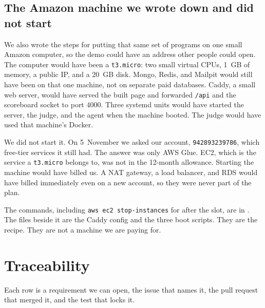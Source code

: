 \documentclass[11pt,a4paper]{article}
\begin{document}
\subsection{The Amazon machine we wrote down and did not start}

We also wrote the steps for putting that same set of programs on one small Amazon computer, so the demo could have an address other people could open. The computer would have been a \texttt{t3.micro}: two small virtual CPUs, 1~GB of memory, a public IP, and a 20~GB disk. Mongo, Redis, and Mailpit would still have been on that one machine, not on separate paid databases. Caddy, a small web server, would have served the built page and forwarded \texttt{/api} and the scoreboard socket to port 4000. Three systemd units would have started the server, the judge, and the agent when the machine booted. The judge would have used that machine's Docker.

We did not start it. On 5~November we asked our account, \texttt{942893239786}, which free-tier services it still had. The answer was only AWS Glue. EC2, which is the service a \texttt{t3.micro} belongs to, was not in the 12-month allowance. Starting the machine would have billed us. A NAT gateway, a load balancer, and RDS would have billed immediately even on a new account, so they were never part of the plan.

The commands, including \texttt{aws ec2 stop-instances} for after the slot, are in . The files beside it are the Caddy config and the three boot scripts. They are the recipe. They are not a machine we are paying for.

\section{Traceability}
\label{sec:trace}

Each row is a requirement we can open, the issue that names it, the pull request that merged it, and the test that locks it.
\end{document}
